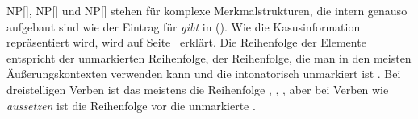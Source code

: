 NP[], NP[] und NP[] stehen für komplexe Merkmalstrukturen, die intern
genauso aufgebaut sind wie der Eintrag für \emph{gibt} in (). Wie die Kasusinformation
repräsentiert wird, wird auf Seite~\pageref{page-ref-case-feat} erklärt. Die Reihenfolge der
Elemente entspricht der unmarkierten Reihenfolge\label{page-unmarkierte-Reihenfolge}, \dash der Reihenfolge, die man in den meisten
Äußerungskontexten verwenden kann und die intonatorisch unmarkiert ist \citep{Hoehle82a}. Bei dreistelligen Verben ist
das meistens die Reihenfolge , , , aber bei Verben wie
\emph{aussetzen} ist die Reihenfolge  vor  die unmarkierte \parencites[]{Wegener85b}[S.\,60]{Hoberg81a}. 
%

